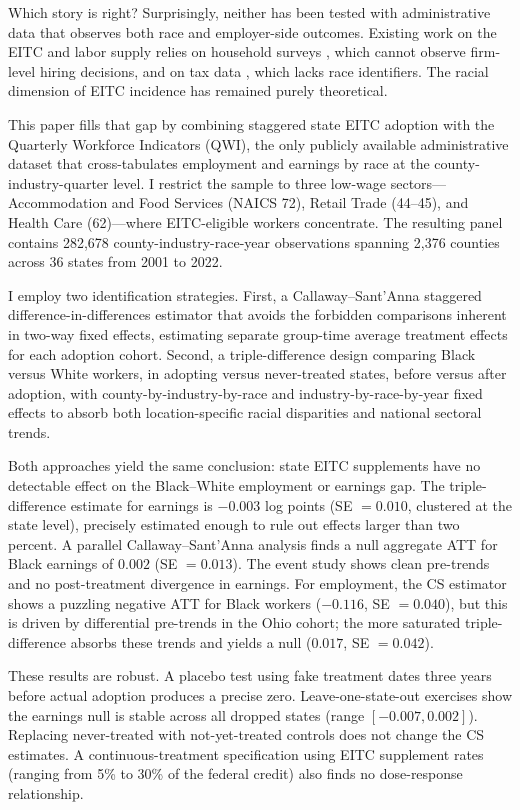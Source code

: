 \documentclass[12pt]{article}
\begin{document}
Which story is right? Surprisingly, neither has been tested with administrative data that observes both race and employer-side outcomes. Existing work on the EITC and labor supply relies on household surveys \citep{eissa1996, meyer2001}, which cannot observe firm-level hiring decisions, and on tax data \citep{chetty2013}, which lacks race identifiers. The racial dimension of EITC incidence has remained purely theoretical.

This paper fills that gap by combining staggered state EITC adoption with the Quarterly Workforce Indicators (QWI), the only publicly available administrative dataset that cross-tabulates employment and earnings by race at the county-industry-quarter level. I restrict the sample to three low-wage sectors---Accommodation and Food Services (NAICS 72), Retail Trade (44--45), and Health Care (62)---where EITC-eligible workers concentrate. The resulting panel contains 282,678 county-industry-race-year observations spanning 2,376 counties across 36 states from 2001 to 2022.

I employ two identification strategies. First, a Callaway--Sant'Anna staggered difference-in-differences estimator \citep{callaway2021} that avoids the forbidden comparisons inherent in two-way fixed effects, estimating separate group-time average treatment effects for each adoption cohort. Second, a triple-difference design comparing Black versus White workers, in adopting versus never-treated states, before versus after adoption, with county-by-industry-by-race and industry-by-race-by-year fixed effects to absorb both location-specific racial disparities and national sectoral trends.

Both approaches yield the same conclusion: state EITC supplements have no detectable effect on the Black--White employment or earnings gap. The triple-difference estimate for earnings is $-0.003$ log points (SE $= 0.010$, clustered at the state level), precisely estimated enough to rule out effects larger than two percent. A parallel Callaway--Sant'Anna analysis finds a null aggregate ATT for Black earnings of $0.002$ (SE $= 0.013$). The event study shows clean pre-trends and no post-treatment divergence in earnings. For employment, the CS estimator shows a puzzling negative ATT for Black workers ($-0.116$, SE $= 0.040$), but this is driven by differential pre-trends in the Ohio cohort; the more saturated triple-difference absorbs these trends and yields a null ($0.017$, SE $= 0.042$).

These results are robust. A placebo test using fake treatment dates three years before actual adoption produces a precise zero. Leave-one-state-out exercises show the earnings null is stable across all dropped states (range $[-0.007, 0.002]$). Replacing never-treated with not-yet-treated controls does not change the CS estimates. A continuous-treatment specification using EITC supplement rates (ranging from 5\% to 30\% of the federal credit) also finds no dose-response relationship.
\end{document}
